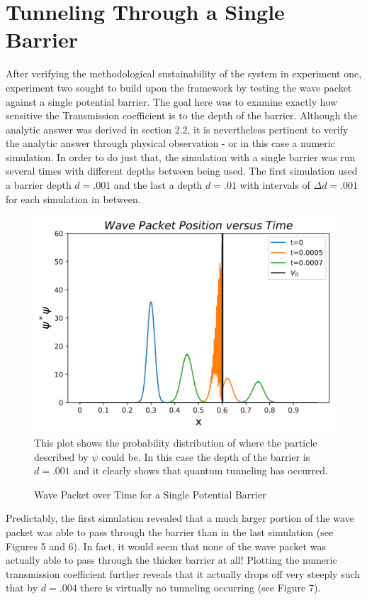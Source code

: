 \documentclass[twocolumn]{article}
\begin{document}
\section{Tunneling Through a Single Barrier}
\hspace{\parindent}After verifying the methodological sustainability of the system in experiment one, experiment two sought to build upon the framework by testing the wave packet against a single potential barrier. The goal here was to examine exactly how sensitive the Transmission coefficient is to the depth of the barrier. Although the analytic answer was derived in section 2.2, it is nevertheless pertinent to verify the analytic answer through physical observation - or in this case a numeric simulation. In order to do just that, the simulation with a single barrier was run several times with different depths between being used. The first simulation used a barrier depth $d=.001$ and the last a depth $d=.01$ with intervals of $\Delta d=.001$ for each simulation in between.
\begin{figure}[H]
\centering
\caption{Wave Packet over Time for a Single Potential Barrier}
\includegraphics[scale=.5]{Position2}
\small{This plot shows the probability distribution of where the particle described by $\psi$ could be. In this case the depth of the barrier is $d=.001$ and it clearly shows that quantum tunneling has occurred.}
\end{figure}
Predictably, the first simulation revealed that a much larger portion of the wave packet was able to pass through the barrier than in the last simulation (see Figures 5 and 6). In fact, it would seem that none of the wave packet was actually able to pass through the thicker barrier at all! Plotting the numeric transmission coefficient further reveals that it actually drops off very steeply such that by $d=.004$ there is virtually no tunneling occurring (see Figure 7).
\end{document}
